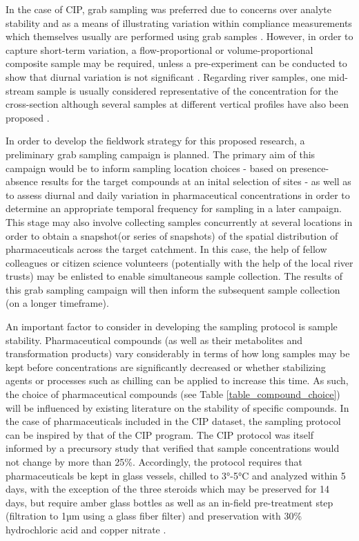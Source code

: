 \documentclass{article}
\begin{document}
In the case of CIP, grab sampling was preferred due to concerns over analyte stability and as a means of illustrating variation within compliance measurements which themselves usually are performed using grab samples \citep{Gardner2012TheEffluents}. However, in order to capture short-term variation, a flow-proportional or volume-proportional composite sample may be required, unless a pre-experiment can be conducted to show that diurnal variation is not significant \citep{Ort2010SamplingReview}. Regarding river samples, one mid-stream sample is usually considered representative of the concentration for the cross-section although several samples at different vertical profiles have also been proposed \citep{Comoretto2005ComparingRiver}.

In order to develop the fieldwork strategy for this proposed research, a preliminary grab sampling campaign is planned. The primary aim of this campaign would be to inform sampling location choices - based on presence-absence results for the target compounds at an inital selection of sites - as well as to assess diurnal and daily variation in pharmaceutical concentrations in order to determine an appropriate temporal frequency for sampling in a later campaign. This stage may also involve collecting samples concurrently at several locations in order to obtain a snapshot(or series of snapshots) of the spatial distribution of pharmaceuticals across the target catchment. In this case, the help of fellow colleagues or citizen science volunteers (potentially with the help of the local river trusts) may be enlisted to enable simultaneous sample collection. The results of this grab sampling campaign will then inform the subsequent sample collection (on a longer timeframe).

An important factor to consider in developing the sampling protocol is sample stability. Pharmaceutical compounds (as well as their metabolites and transformation products) vary considerably in terms of how long samples may be kept before concentrations are significantly decreased \citep{Caban2015AnalyticalProspects} or whether stabilizing agents or processes such as chilling can be applied to increase this time. As such, the choice of pharmaceutical compounds (see Table \ref{table_compound_choice}) will be influenced by existing literature on the stability of specific compounds. In the case of pharmaceuticals included in the CIP dataset, the sampling protocol can be inspired by that of the CIP program. The CIP protocol was itself informed by a precursory study \citep{Gardner2012SampleWastewater} that verified that sample concentrations would not change by more than 25\%. Accordingly, the protocol requires that pharmaceuticals be kept in glass vessels, chilled to 3°-5°C and analyzed within 5 days, with the exception of the three steroids which may be preserved for 14 days, but require amber glass bottles as well as an in-field pre-treatment step (filtration to 1µm using a glass fiber filter) and preservation with 30\% hydrochloric acid and copper nitrate \citep{UKWIR2015DraftGuidance}.
\end{document}
